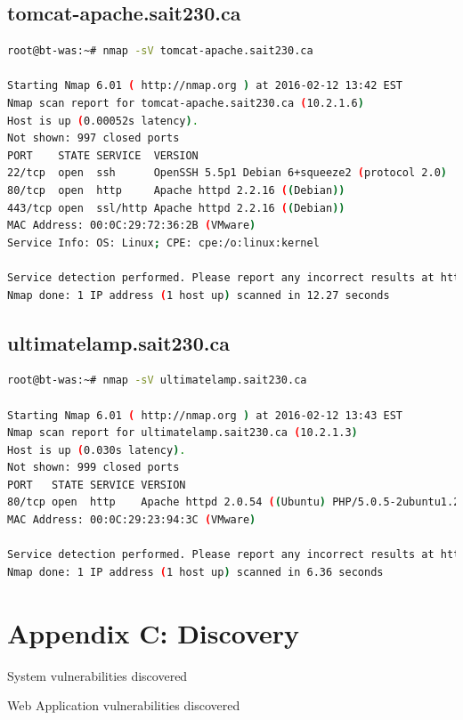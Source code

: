 \documentclass{article}
\begin{document}
\subsection{tomcat-apache.sait230.ca}

\begin{lstlisting}[language=bash]
root@bt-was:~# nmap -sV tomcat-apache.sait230.ca

Starting Nmap 6.01 ( http://nmap.org ) at 2016-02-12 13:42 EST
Nmap scan report for tomcat-apache.sait230.ca (10.2.1.6)
Host is up (0.00052s latency).
Not shown: 997 closed ports
PORT    STATE SERVICE  VERSION
22/tcp  open  ssh      OpenSSH 5.5p1 Debian 6+squeeze2 (protocol 2.0)
80/tcp  open  http     Apache httpd 2.2.16 ((Debian))
443/tcp open  ssl/http Apache httpd 2.2.16 ((Debian))
MAC Address: 00:0C:29:72:36:2B (VMware)
Service Info: OS: Linux; CPE: cpe:/o:linux:kernel

Service detection performed. Please report any incorrect results at http://nmap.org/submit/ .
Nmap done: 1 IP address (1 host up) scanned in 12.27 seconds
\end{lstlisting}

\subsection{ultimatelamp.sait230.ca}

\begin{lstlisting}[language=bash]
root@bt-was:~# nmap -sV ultimatelamp.sait230.ca

Starting Nmap 6.01 ( http://nmap.org ) at 2016-02-12 13:43 EST
Nmap scan report for ultimatelamp.sait230.ca (10.2.1.3)
Host is up (0.030s latency).
Not shown: 999 closed ports
PORT   STATE SERVICE VERSION
80/tcp open  http    Apache httpd 2.0.54 ((Ubuntu) PHP/5.0.5-2ubuntu1.2)
MAC Address: 00:0C:29:23:94:3C (VMware)

Service detection performed. Please report any incorrect results at http://nmap.org/submit/ .
Nmap done: 1 IP address (1 host up) scanned in 6.36 seconds
\end{lstlisting}

\newpage
\section{Appendix C: Discovery}

System vulnerabilities discovered


Web Application vulnerabilities discovered
\end{document}
